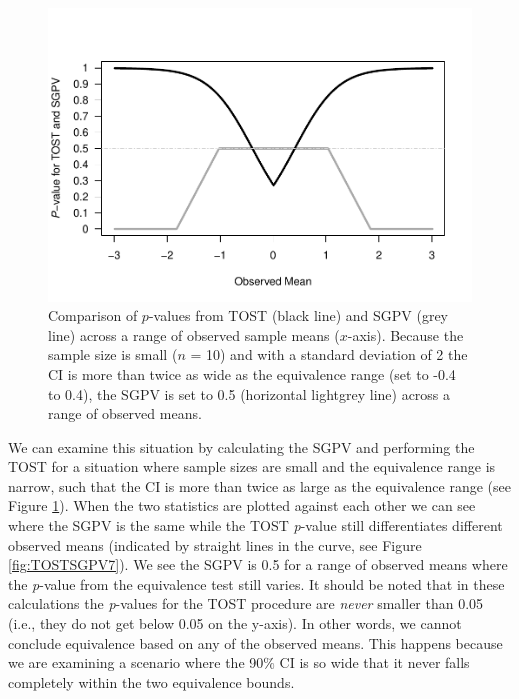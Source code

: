 \documentclass[
  english,
  man]{apa6}
\begin{document}
\begin{figure}

{\centering \includegraphics[height=0.94\textheight]{chp5_format-Rmd_bib_files/figure-latex/TOSTSGPV6-1} 

}

\caption{Comparison of $p$-values from TOST (black line) and SGPV (grey line) across a range of observed sample means ($x$-axis). Because the sample size is small ($n$ = 10) and with a standard deviation of 2 the CI is more than twice as wide as the equivalence range (set to -0.4 to 0.4), the SGPV is set to 0.5 (horizontal lightgrey line) across a range of observed means.}\label{fig:TOSTSGPV6}
\end{figure}

We can examine this situation by calculating the SGPV and performing the TOST for a situation where sample sizes are small and the equivalence range is narrow, such that the CI is more than twice as large as the equivalence range (see Figure \ref{fig:TOSTSGPV6}). When the two statistics are plotted against each other we can see where the SGPV is the same while the TOST \emph{p}-value still differentiates different observed means (indicated by straight lines in the curve, see Figure \ref{fig:TOSTSGPV7}). We see the SGPV is 0.5 for a range of observed means where the \emph{p}-value from the equivalence test still varies. It should be noted that in these calculations the \emph{p}-values for the TOST procedure are \emph{never} smaller than 0.05 (i.e., they do not get below 0.05 on the y-axis). In other words, we cannot conclude equivalence based on any of the observed means. This happens because we are examining a scenario where the 90\(\%\) CI is so wide that it never falls completely within the two equivalence bounds.
\end{document}
